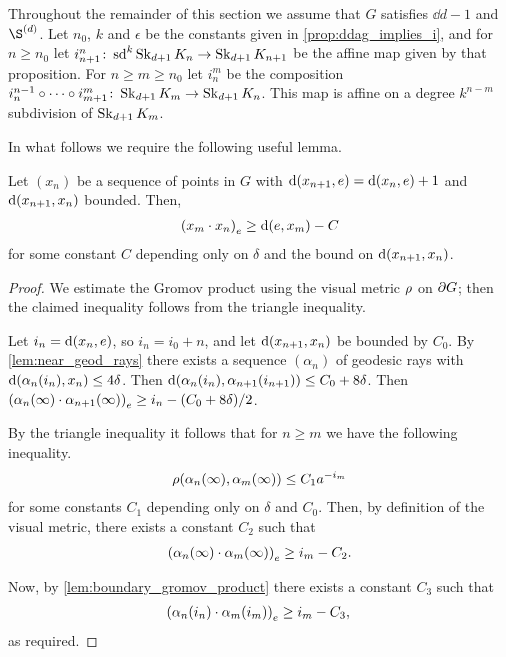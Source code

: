 \documentclass[a4paper]{article}
\begin{document}
Throughout the remainder of this section we assume that $G$ satisfies $\dd{d-1}$ 
and $\Sd{d}$. Let $n_0$, $k$ and $\epsilon$ be the constants given in 
\cref{prop:ddag_implies_i}, and for $n\geq n_0$ let $i^n_{n+1} 
\from \sd^k\Skel_{d+1} K_n \to \Skel_{d+1} K_{n+1}$ be the affine map given by 
that proposition.  For $n \geq m \geq n_0$ let $i^m_n$ be the composition 
$i^{n-1}_n \composed \dotsb \composed i^m_{m+1} \from \Skel_{d+1} K_m \to 
\Skel_{d+1} K_n$.  This map is affine on a degree $k^{n-m}$ subdivision of 
$\Skel_{d+1} K_m$.

In what follows we require the following useful lemma.

\begin{lemma}\label{lem:useful}
  Let $(x_n)$ be a sequence of points in $G$ with $\dist(x_{n+1}, e) = 
  \dist(x_n, e) + 1$ and $\dist(x_{n+1}, x_n)$ bounded. Then,
  \begin{align*}
    \gromov{e}{x_m}{x_n} \geq \dist(e,x_m) - C
  \end{align*}
  for some constant $C$ depending only on $\delta$ and the bound on 
  $\dist(x_{n+1}, x_n)$.
\end{lemma}

\begin{proof}
  We estimate the Gromov product using the visual metric $\vdistance$ on 
  $\boundary G$; then the claimed inequality follows from the triangle 
  inequality. 
  
  Let $i_n = \dist(x_n, e)$, so $i_n = i_0 + n$, and let 
  $\dist(x_{n+1},x_n)$ be bounded by $C_0$. By 
  \cref{lem:near_geod_rays} there exists a sequence $(\alpha_n)$ of 
  geodesic rays with $\dist(\alpha_n(i_n), x_n) \leq 4\delta$. Then 
  $\dist(\alpha_n(i_n), \alpha_{n+1}(i_{n+1})) \leq C_0 + 8\delta$. Then 
  $\gromov{e}{\alpha_n(\infty)}{ \alpha_{n+1}(\infty)} \geq i_n - (C_0 + 
  8\delta)/2$.

  By the triangle inequality it follows that for $n\geq m$ we have the following 
  inequality.
  \begin{align*}
    \vdistance(\alpha_n(\infty), \alpha_m(\infty)) \leq C_1 a^{-i_m}
  \end{align*}
  for some constants $C_1$ depending only on $\delta$ and $C_0$. Then, by
  definition of the visual metric, there exists a constant $C_2$ such that
  \begin{align*}
    \gromov{e}{\alpha_n(\infty)}{\alpha_m(\infty)} \geq i_m - C_2.
  \end{align*}

  Now, by \cref{lem:boundary_gromov_product} there exists a constant $C_3$ such
  that
  \begin{align*}
    \gromov{e}{\alpha_n(i_n)}{\alpha_m(i_m)} \geq i_m - C_3,\qedhere
  \end{align*}
  as required.
\end{proof}
\end{document}
